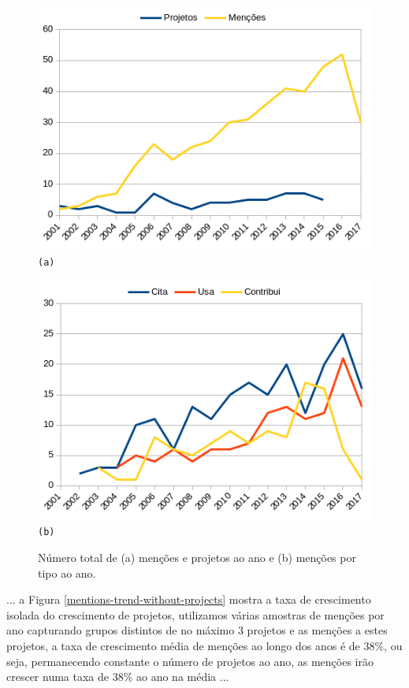 \begin{figure}[h]
  \begin{minipage}{0.5\textwidth}
    \centering
    \includegraphics[scale=0.6]{imagens/mentions-projects-by-year.png}
    \texttt{(a)}
  \end{minipage}
  \begin{minipage}{0.5\textwidth}
    \centering
    \includegraphics[scale=0.6]{imagens/mentions-type-by-year.png}
    \texttt{(b)}
  \end{minipage}
  \caption{Número total de (a) menções e projetos ao ano e (b) menções por tipo ao ano.}
  \label{mentions-by-year}
\end{figure}

... a Figura \ref{mentions-trend-without-projects} mostra a taxa de crescimento
isolada do crescimento de projetos, utilizamos várias amostras de menções por
ano capturando grupos distintos de no máximo 3 projetos e as menções a estes projetos,
a taxa de crescimento média de menções ao longo dos anos é de 38\%, ou seja,
permanecendo constante o número de projetos ao ano, as menções irão crescer numa taxa
de 38\% ao ano na média ...


